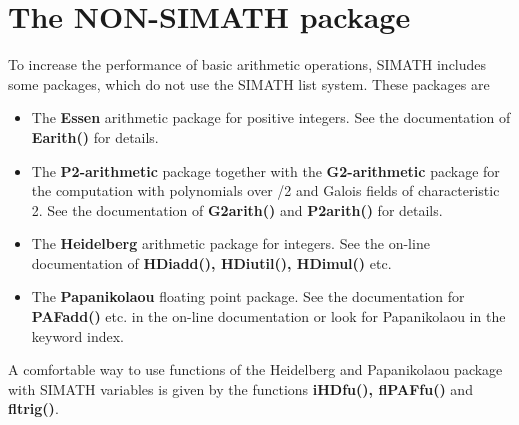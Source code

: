 \section{The NON-SIMATH package}
To increase the performance of basic arithmetic operations, SIMATH includes 
some packages, which do not use the SIMATH list system. These packages are
\begin{itemize}
\item The {\bf Essen} arithmetic package 
        for positive integers. See the
        documentation of 
        {\bf Earith()} for details.
\item The {\bf P2-arithmetic} package together with the
        {\bf G2-arithmetic} package 
        for the computation with polynomials over \Z/2\Z{} and Galois fields
        of characteristic 2.
        See the documentation of {\bf G2arith()} and {\bf P2arith()} 
        for details.
\item The {\bf Heidelberg} arithmetic package for         integers. See the
        on-line documentation of {\bf HDiadd(), HDiutil(), HDimul()} etc.
\item The {\bf Papanikolaou} floating point package. See           the documentation
        for {\bf PAFadd()} etc. in the on-line documentation or look for
        Papanikolaou in the keyword index.
\end{itemize}
A comfortable way to use functions of the Heidelberg and Papanikolaou 
package with SIMATH variables is given by the functions {\bf iHDfu(), flPAFfu()}
and {\bf fltrig()}.

% 

